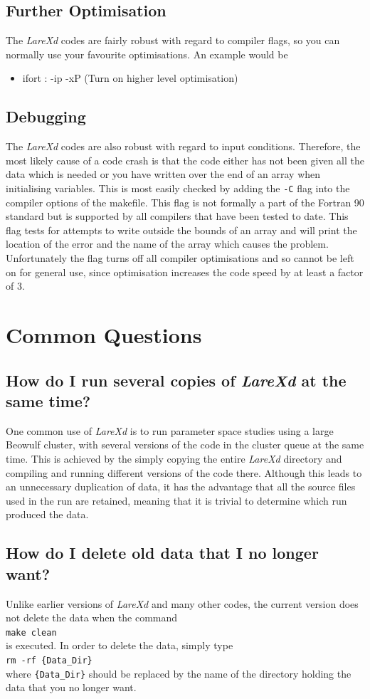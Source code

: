 \documentclass[11pt]{article}
\begin{document}
\subsection{Further Optimisation}
The {\it LareXd} codes are fairly robust with regard to compiler flags, so you can normally use your favourite optimisations. An example would be
\begin{itemize}
\item ifort : -ip -xP (Turn on higher level optimisation)
\end{itemize}
\subsection{Debugging}
The {\it LareXd} codes are also robust with regard to input conditions. Therefore, the most likely cause of a code crash is that the code either has not been given all the data which is needed or you have written over the end of an array when initialising variables. This is most easily checked by adding the \texttt{-C} flag into the compiler options of the makefile. This flag is not formally a part of the Fortran 90 standard but is supported by all compilers that have been tested to date. This flag tests for attempts to write outside the bounds of an array and will print the location of the error and the name of the array which causes the problem. Unfortunately the flag turns off all compiler optimisations and so cannot be left on for general use, since optimisation increases the code speed by at least a factor of 3.

\section{Common Questions}
\subsection*{How do I run several copies of {\it LareXd} at the same time?}
One common use of {\it LareXd} is to run parameter space studies using a large
Beowulf cluster, with several versions of the code in the cluster queue at the
same time. This is achieved by the simply copying the entire {\it
  LareXd} directory and compiling and running different versions of the code
there. Although this leads to an unnecessary duplication of data, it has the
advantage that all the source files used in the run are retained, meaning that
it is trivial to determine which run produced the data.
\subsection*{How do I delete old data that I no longer want?}
Unlike earlier versions of {\it LareXd} and many other codes, the current
version does not delete the data when the command\\
\texttt{make clean}\\
is executed. In order to delete the data, simply type\\
\texttt{rm -rf \{Data\_Dir\}}\\
where \texttt{\{Data\_Dir\}} should be replaced by the name of the directory
holding the data that you no longer want. 
\end{document}
